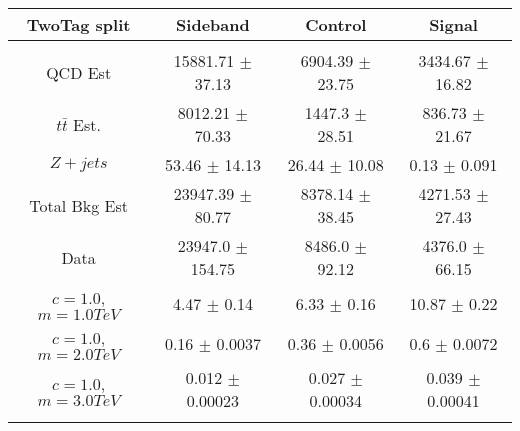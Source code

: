 \begin{footnotesize} 
\begin{tabular}{c|c|c|c} 
TwoTag split & Sideband & Control & Signal \\ 
\hline\hline 
& & & \\ 
QCD Est & 15881.71 $\pm$ 37.13 & 6904.39 $\pm$ 23.75 & 3434.67 $\pm$ 16.82\\ 
$t\bar{t}$ Est.  & 8012.21 $\pm$ 70.33 & 1447.3 $\pm$ 28.51 & 836.73 $\pm$ 21.67\\ 
$Z+jets$ & 53.46 $\pm$ 14.13 & 26.44 $\pm$ 10.08 & 0.13 $\pm$ 0.091\\ 
Total Bkg Est & 23947.39 $\pm$ 80.77 & 8378.14 $\pm$ 38.45 & 4271.53 $\pm$ 27.43\\ 
Data & 23947.0 $\pm$ 154.75 & 8486.0 $\pm$ 92.12 & 4376.0 $\pm$ 66.15\\ 
$c=1.0$,$m=1.0TeV$ & 4.47 $\pm$ 0.14 & 6.33 $\pm$ 0.16 & 10.87 $\pm$ 0.22\\ 
$c=1.0$,$m=2.0TeV$ & 0.16 $\pm$ 0.0037 & 0.36 $\pm$ 0.0056 & 0.6 $\pm$ 0.0072\\ 
$c=1.0$,$m=3.0TeV$ & 0.012 $\pm$ 0.00023 & 0.027 $\pm$ 0.00034 & 0.039 $\pm$ 0.00041\\ 
& & & \\ 
\hline\hline 
\end{tabular} 
\end{footnotesize} 
\newline 
